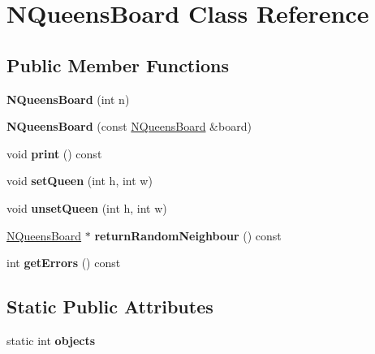 \hypertarget{class_n_queens_board}{
\section{NQueensBoard Class Reference}
\label{class_n_queens_board}
}
\subsection*{Public Member Functions}
\begin{DoxyCompactItemize}
\item 
\hypertarget{class_n_queens_board_ae27257aefc2fdb993c0e9a2295fdda0b}{
{\bfseries NQueensBoard} (int n)}
\label{class_n_queens_board_ae27257aefc2fdb993c0e9a2295fdda0b}

\item 
\hypertarget{class_n_queens_board_a43c0a92f75a042ec20587febcb7c51f2}{
{\bfseries NQueensBoard} (const \hyperlink{class_n_queens_board}{NQueensBoard} \&board)}
\label{class_n_queens_board_a43c0a92f75a042ec20587febcb7c51f2}

\item 
\hypertarget{class_n_queens_board_ac7280591bf61f1ac68ceed1e805ac7c6}{
void {\bfseries print} () const }
\label{class_n_queens_board_ac7280591bf61f1ac68ceed1e805ac7c6}

\item 
\hypertarget{class_n_queens_board_ad773a394ba98ae26cb2c346be1d6e796}{
void {\bfseries setQueen} (int h, int w)}
\label{class_n_queens_board_ad773a394ba98ae26cb2c346be1d6e796}

\item 
\hypertarget{class_n_queens_board_ae4c291447e5623e67c0a17d24c824b1b}{
void {\bfseries unsetQueen} (int h, int w)}
\label{class_n_queens_board_ae4c291447e5623e67c0a17d24c824b1b}

\item 
\hypertarget{class_n_queens_board_a6f1ff2fa1fe0412470346884670584c4}{
\hyperlink{class_n_queens_board}{NQueensBoard} $\ast$ {\bfseries returnRandomNeighbour} () const }
\label{class_n_queens_board_a6f1ff2fa1fe0412470346884670584c4}

\item 
\hypertarget{class_n_queens_board_a7fb84206933f5a156feccd439433e2d5}{
int {\bfseries getErrors} () const }
\label{class_n_queens_board_a7fb84206933f5a156feccd439433e2d5}

\end{DoxyCompactItemize}
\subsection*{Static Public Attributes}
\begin{DoxyCompactItemize}
\item 
\hypertarget{class_n_queens_board_a3cbb8bfbf17434f2e3b8f0fd1dd2c9c3}{
static int {\bfseries objects}}
\label{class_n_queens_board_a3cbb8bfbf17434f2e3b8f0fd1dd2c9c3}

\end{DoxyCompactItemize}
